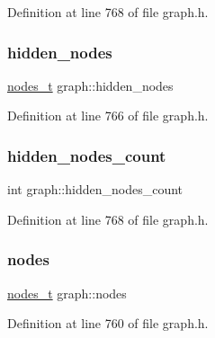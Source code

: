 Definition at line 768 of file graph.\+h.

\mbox{\label{classgraph_a7a3f2842a409a4b35ca8ef34598df9ca}} 
\subsubsection{\texorpdfstring{hidden\+\_\+nodes}{hidden\_nodes}}
{\footnotesize\ttfamily \mbox{\hyperlink{edge_8h_a22ac17689106ba21a84e7bc54d1199d6}{nodes\+\_\+t}} graph\+::hidden\+\_\+nodes\hspace{0.3cm}{\ttfamily [private]}}



Definition at line 766 of file graph.\+h.

\mbox{\label{classgraph_aa72548d972d226a69f7f8fb92b363860}} 
\subsubsection{\texorpdfstring{hidden\+\_\+nodes\+\_\+count}{hidden\_nodes\_count}}
{\footnotesize\ttfamily int graph\+::hidden\+\_\+nodes\+\_\+count\hspace{0.3cm}{\ttfamily [private]}}



Definition at line 768 of file graph.\+h.

\mbox{\label{classgraph_a4ea0592e8eb7c26c5abad24546907726}} 
\subsubsection{\texorpdfstring{nodes}{nodes}}
{\footnotesize\ttfamily \mbox{\hyperlink{edge_8h_a22ac17689106ba21a84e7bc54d1199d6}{nodes\+\_\+t}} graph\+::nodes\hspace{0.3cm}{\ttfamily [private]}}



Definition at line 760 of file graph.\+h.

\mbox{\label{classgraph_a1f59223d0bcf647920963d7a661dd74a}} 
